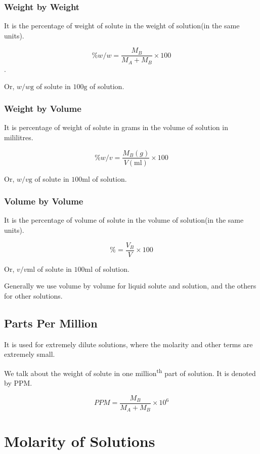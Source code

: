\subsubsection{Weight by Weight}

It is the percentage of weight of solute in the weight of solution(in the same units).

\[ \% w/w = \frac{M_B}{M_A + M_B} \times 100\].

Or, \(w/w \si{\g}\) of solute in \(100 \si{\g}\) of solution.

\subsubsection{Weight by Volume}

It is percentage of weight of solute in grams in the volume of solution in mililitres.

\[ \% w/v = \frac{M_B(\si{g})}{V(\si{\ml})} \times 100\]

Or, \(w/v \si{\g}\) of solute in \(100 \si{\ml}\) of solution.

\subsubsection{Volume by Volume}

It is the percentage of volume of solute in the volume of solution(in the same units).

\[ \% = \frac{V_B}{V} \times 100\]

Or, \(v/v \si{\ml}\) of solute in \(100 \si{\ml}\) of solution.

Generally we use volume by volume for liquid solute and solution, and the others
for other solutions. 

\subsection{Parts Per Million}

It is used for extremely dilute solutions, where the molarity and other terms
are extremely small.

We talk about the weight of solute in one million\textsuperscript{th} part of solution.
It is denoted by PPM. 

\begin{equation}
  PPM = \frac{M_B}{M_A + M_B} \times 10^6
\end{equation}

\section{Molarity of Solutions}

